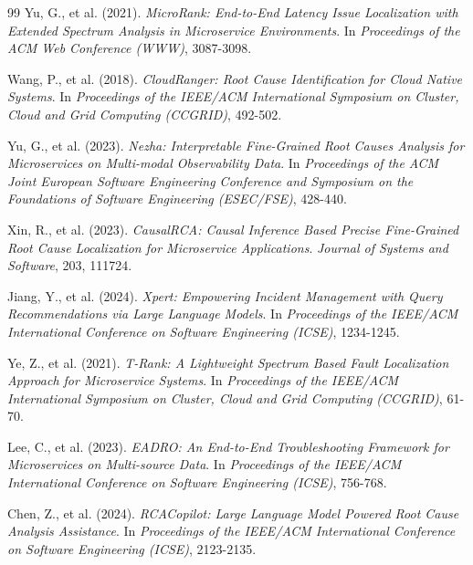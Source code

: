 \documentclass[10pt,a4paper,twocolumn]{article}
\begin{document}
\begin{thebibliography}{99}
Yu, G., et al. (2021).
\textit{MicroRank: End-to-End Latency Issue Localization with Extended Spectrum Analysis in Microservice Environments}.
In \textit{Proceedings of the ACM Web Conference (WWW)}, 3087-3098.

Wang, P., et al. (2018).
\textit{CloudRanger: Root Cause Identification for Cloud Native Systems}.
In \textit{Proceedings of the IEEE/ACM International Symposium on Cluster, Cloud and Grid Computing (CCGRID)}, 492-502.

Yu, G., et al. (2023).
\textit{Nezha: Interpretable Fine-Grained Root Causes Analysis for Microservices on Multi-modal Observability Data}.
In \textit{Proceedings of the ACM Joint European Software Engineering Conference and Symposium on the Foundations of Software Engineering (ESEC/FSE)}, 428-440.

Xin, R., et al. (2023).
\textit{CausalRCA: Causal Inference Based Precise Fine-Grained Root Cause Localization for Microservice Applications}.
\textit{Journal of Systems and Software}, 203, 111724.

Jiang, Y., et al. (2024).
\textit{Xpert: Empowering Incident Management with Query Recommendations via Large Language Models}.
In \textit{Proceedings of the IEEE/ACM International Conference on Software Engineering (ICSE)}, 1234-1245.

Ye, Z., et al. (2021).
\textit{T-Rank: A Lightweight Spectrum Based Fault Localization Approach for Microservice Systems}.
In \textit{Proceedings of the IEEE/ACM International Symposium on Cluster, Cloud and Grid Computing (CCGRID)}, 61-70.

Lee, C., et al. (2023).
\textit{EADRO: An End-to-End Troubleshooting Framework for Microservices on Multi-source Data}.
In \textit{Proceedings of the IEEE/ACM International Conference on Software Engineering (ICSE)}, 756-768.

Chen, Z., et al. (2024).
\textit{RCACopilot: Large Language Model Powered Root Cause Analysis Assistance}.
In \textit{Proceedings of the IEEE/ACM International Conference on Software Engineering (ICSE)}, 2123-2135.

\end{thebibliography}
\end{document}
